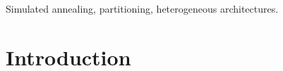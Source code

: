 \documentclass[10pt, conference, compsocconf]{IEEEtran}
\begin{document}
\begin{abstract}


\end{abstract}

\begin{IEEEkeywords}
Simulated annealing, partitioning, heterogeneous architectures.

\end{IEEEkeywords}


%
\IEEEpeerreviewmaketitle



\section{Introduction}
\end{document}
